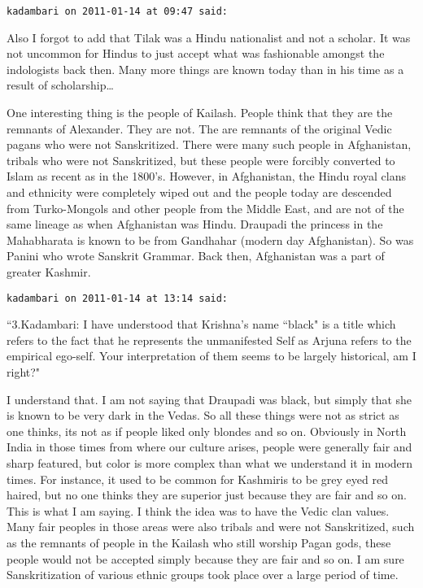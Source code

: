 \begin{footnotesize}
\begin{sffamily}
\texttt{kadambari on 2011-01-14 at 09:47 said: }

Also I forgot to add that Tilak was a Hindu nationalist and not a scholar. It was not uncommon for Hindus to just accept what was fashionable amongst the indologists back then. Many more things are known today than in his time as a result of scholarship… 

One interesting thing is the people of Kailash. People think that they are the remnants of Alexander. They are not. The are remnants of the original Vedic pagans who were not Sanskritized. There were many such people in Afghanistan, tribals who were not Sanskritized, but these people were forcibly converted to Islam as recent as in the 1800's. However, in Afghanistan, the Hindu royal clans and ethnicity were completely wiped out and the people today are descended from Turko-Mongols and other people from the Middle East, and are not of the same lineage as when Afghanistan was Hindu. Draupadi the princess in the Mahabharata is known to be from Gandhahar (modern day Afghanistan). So was Panini who wrote Sanskrit Grammar. Back then, Afghanistan was a part of greater Kashmir.


\hfill

\texttt{kadambari on 2011-01-14 at 13:14 said: }

``3.Kadambari: I have understood that Krishna's name ``black" is a title which refers to the fact that he represents the unmanifested Self as Arjuna refers to the empirical ego-self. Your interpretation of them seems to be largely historical, am I right?"

I understand that. I am not saying that Draupadi was black, but simply that she is known to be very dark in the Vedas. So all these things were not as strict as one thinks, its not as if people liked only blondes and so on. Obviously in North India in those times from where our culture arises, people were generally fair and sharp featured, but color is more complex than what we understand it in modern times. For instance, it used to be common for Kashmiris to be grey eyed red haired, but no one thinks they are superior just because they are fair and so on. This is what I am saying. I think the idea was to have the Vedic clan values. Many fair peoples in those areas were also tribals and were not Sanskritized, such as the remnants of people in the Kailash who still worship Pagan gods, these people would not be accepted simply because they are fair and so on. I am sure Sanskritization of various ethnic groups took place over a large period of time.


\end{sffamily}
\end{footnotesize}
